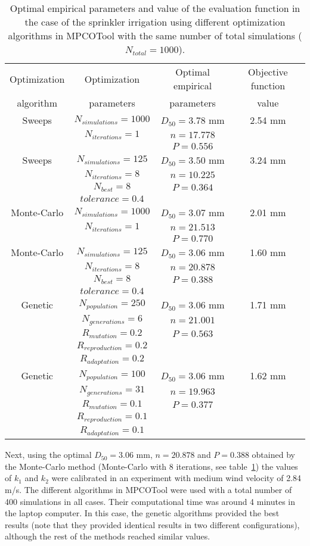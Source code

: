 \documentclass[review,authoryear]{elsarticle}
\newcommand{\TABLE}[5]
{
	\begin{table}[ht!]
		\centering
		\caption{#4.\label{#5}}
		#1
		\begin{tabular}{#2}
			#3
		\end{tabular}
	\end{table}
}
\begin{document}
\TABLE{\scriptsize}{cccc}
{
	Optimization & Optimization & Optimal empirical & Objective function
	\\ algorithm & parameters & parameters & value
	\\ \hline
	Sweeps & $N_{simulations}=1000$ & $D_{50}=3.78$ mm & 2.54 mm
	\\ & $N_{iterations}=1$ & $n=17.778$
	\\ & & $P=0.556$
	\\ \hline
	Sweeps & $N_{simulations}=125$ & $D_{50}=3.50$ mm & 3.24 mm
	\\ & $N_{iterations}=8$ & $n=10.225$
	\\ & $N_{best}=8$ & $P=0.364$
	\\ & $tolerance=0.4$
	\\ \hline
	Monte-Carlo & $N_{simulations}=1000$ & $D_{50}=3.07$ mm & 2.01 mm
	\\ & $N_{iterations}=1$ & $n=21.513$
	\\ & & $P=0.770$
	\\ \hline
	Monte-Carlo & $N_{simulations}=125$ & $D_{50}=3.06$ mm & 1.60 mm
	\\ & $N_{iterations}=8$ & $n=20.878$
	\\ & $N_{best}=8$ & $P=0.388$
	\\ & $tolerance=0.4$
	\\ \hline
	Genetic & $N_{population}=250$ & $D_{50}=3.06$ mm & 1.71 mm
	\\ & $N_{generations}=6$ & $n=21.001$
	\\ & $R_{mutation}=0.2$ & $P=0.563$
	\\ & $R_{reproduction}=0.2$
	\\ & $R_{adaptation}=0.2$
	\\ \hline
	Genetic & $N_{population}=100$ & $D_{50}=3.06$ mm & 1.62 mm
	\\ & $N_{generations}=31$ & $n=19.963$
	\\ & $R_{mutation}=0.1$ & $P=0.377$
	\\ & $R_{reproduction}=0.1$
	\\ & $R_{adaptation}=0.1$
	\\ \hline
}{Optimal empirical parameters and value of the evaluation function in the case of the sprinkler irrigation
using different optimization algorithms in MPCOTool with the same number of total simulations ($N_{total}=1000$)}{TabSprinklerI}

Next, using the optimal $D_{50}=3.06$ mm, $n=20.878$ and $P=0.388$ obtained by the Monte-Carlo method (Monte-Carlo with 8 iterations, see table~\ref{TabSprinklerI}) the values of $k_1$ and $k_2$ were calibrated in an experiment with medium wind velocity of 2.84 m/s. The different algorithms in MPCOTool were used with a total number of 400 simulations in all cases. Their computational time was around 4 minutes in the laptop computer. In this case, the genetic algorithms provided the best results  (note that they provided identical results in two different configurations), although the rest of the methods reached similar values.
\end{document}
